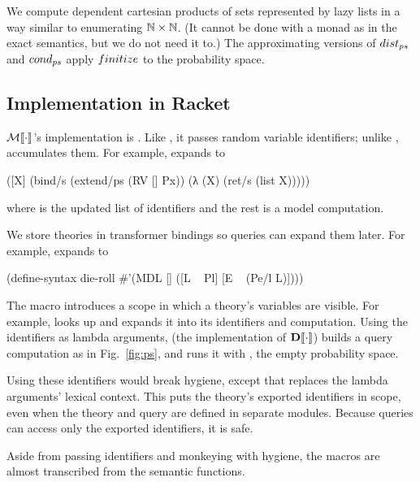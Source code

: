 We compute dependent cartesian products of sets represented by lazy lists in a way similar to enumerating $\mathbb{N} \times \mathbb{N}$. (It cannot be done with a monad as in the exact semantics, but we do not need it to.) The approximating versions of $dist_{ps}$ and $cond_{ps}$ apply $finitize$ to the probability space.

\subsection{Implementation in Racket}

$\mathcal{M}\!\left\llbracket{\cdot}\right\rrbracket$'s implementation is . Like , it passes random variable identifiers; unlike ,  accumulates them. For example,  expands to
\begin{center}
\begin{schemedisplay}
([X] (bind/s (extend/ps (RV [] Px)) (λ (X) (ret/s (list X)))))
\end{schemedisplay}
\end{center}
where \scheme{[X]} is the updated list of identifiers and the rest is a model computation.

We store theories in transformer bindings so queries can expand them later. For example,  expands to
\begin{center}
\begin{schemedisplay}
(define-syntax die-roll #'(MDL [] ([L ~ Pl] [E ~ (Pe/l L)])))
\end{schemedisplay}
\end{center}
The macro  introduces a scope in which a theory's variables are visible. For example,   looks up  and expands it into its identifiers and computation. Using the identifiers as lambda arguments,  (the implementation of $\mathbf{D}\!\left\llbracket{\cdot}\right\rrbracket$) builds a query computation as in Fig.~\ref{fig:ps}, and runs it with , the empty probability space.

Using these identifiers would break hygiene, except that  replaces the lambda arguments' lexical context. This puts the theory's exported identifiers in scope, even when the theory and query are defined in separate modules. Because queries can access only the exported identifiers, it is safe.

Aside from passing identifiers and monkeying with hygiene, the macros are almost transcribed from the semantic functions.

